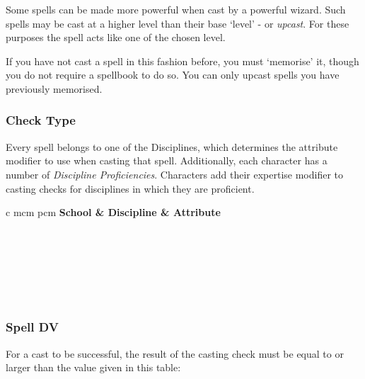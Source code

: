 \begin{landscape}
\begin{multicols}{3}
Some spells can be made more powerful when cast by a powerful wizard. Such spells may be cast at a higher level than their base `level' - or {\it upcast}. For these purposes the spell acts like one of the chosen level. 

If you have not cast a spell in this fashion before, you must `memorise' it, though you do not require a spellbook to do so. You can only upcast spells you have previously memorised.

\subsubsection{Check Type}
Every spell belongs to one of the Disciplines, which determines the attribute modifier to use when casting that spell. Additionally, each character has a number of {\it Discipline Proficiencies}. Characters add their expertise modifier to casting checks for disciplines in which they are proficient.  
\begin{center}
	\begin{rndtable}{c m{\xS cm} p{\wS cm}}
	\bf School	&	\bf Discipline	&	\bf Attribute
	\\
	\\
	\\
	\\
   \\ 
	\\
	\\
	\end{rndtable}
\end{center}

\subsubsection{Spell DV}
For a cast to be successful, the result of the casting check must be equal to or larger than the value given in this table:

\def\cc{\cellcolor{\tablecolorhead}\bf}


\end{multicols}
\end{landscape}
